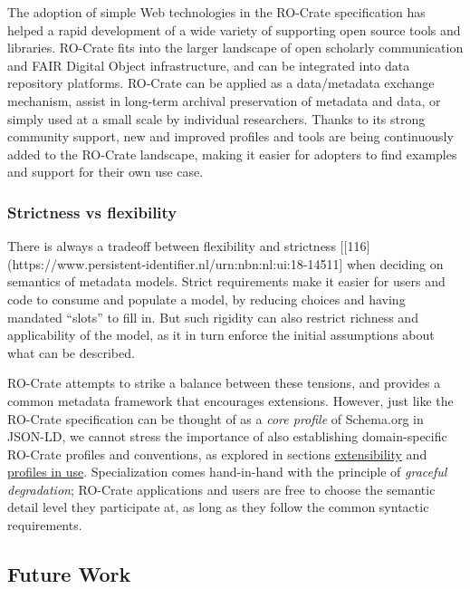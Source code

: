 {The adoption of simple Web technologies in the RO-Crate specification
has helped a rapid development of a wide variety of supporting open
source tools and libraries. RO-Crate fits into the larger landscape of
open scholarly communication and FAIR Digital Object infrastructure, and
can be integrated into data repository platforms. RO-Crate can be
applied as a data/metadata exchange mechanism, assist in long-term
archival preservation of metadata and data, or simply used at a small
scale by individual researchers. Thanks to its strong community support,
new and improved profiles and tools are being continuously added to the
RO-Crate landscape, making it easier for adopters to find examples and
support for their own use case.

\hypertarget{strictness-vs-flexibility}{%
\subsubsection{Strictness vs
flexibility}\label{strictness-vs-flexibility}}

There is always a tradeoff between flexibility and strictness
{[}{[}116{]}(https://www.persistent-identifier.nl/urn:nbn:nl:ui:18-14511{]}
when deciding on semantics of metadata models. Strict requirements make
it easier for users and code to consume and populate a model, by
reducing choices and having mandated ``slots'' to fill in. But such
rigidity can also restrict richness and applicability of the model, as
it in turn enforce the initial assumptions about what can be described.

RO-Crate attempts to strike a balance between these tensions, and
provides a common metadata framework that encourages extensions.
However, just like the RO-Crate specification can be thought of as a
\emph{core profile} of Schema.org in JSON-LD, we cannot stress the
importance of also establishing domain-specific RO-Crate profiles and
conventions, as explored in sections
\protect\hyperlink{profiles}{extensibility} and
\protect\hyperlink{inuse}{profiles in use}. Specialization comes
hand-in-hand with the principle of \emph{graceful degradation}; RO-Crate
applications and users are free to choose the semantic detail level they
participate at, as long as they follow the common syntactic
requirements.

\hypertarget{futurework}{%
\subsection{Future Work}\label{futurework}}

}
